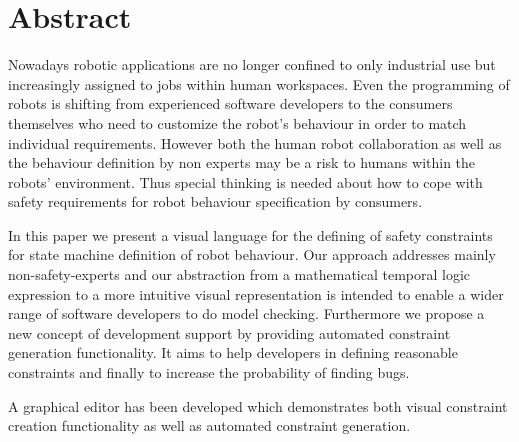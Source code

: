 \chapter*{Abstract}

Nowadays robotic applications are no longer confined to only industrial use but increasingly assigned to jobs within human workspaces. Even the programming of robots is shifting from experienced software developers to the consumers themselves who need to customize the robot's behaviour in order to match individual requirements.
However both the human robot collaboration as well as the behaviour definition by non experts may be a risk to humans within the robots' environment.
Thus special thinking is needed about how to cope with safety requirements for robot behaviour specification by consumers.

In this paper we present a visual language for the defining of safety constraints for state machine definition of robot behaviour. Our approach addresses mainly non-safety-experts and our abstraction from a mathematical temporal logic expression to a more intuitive visual representation is intended to enable a wider range of software developers to do model checking.
Furthermore we propose a new concept of development support by providing automated constraint generation functionality. It aims to help developers in defining reasonable constraints and finally to increase the probability of finding bugs.

A graphical editor has been developed which demonstrates both visual constraint creation functionality as well as automated constraint generation.